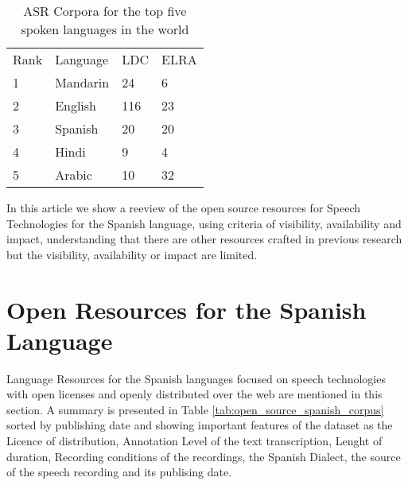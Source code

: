 \documentclass[10pt, a4paper]{article}
\begin{document}
\begin{table}[h]
\caption{ASR Corpora for the top five spoken languages in the world \cite{HernndezMena2017}}
\label{tab:resources_by_langauge}
\begin{tabular}{llll}
Rank & Language & LDC & ELRA \\
1    & Mandarin & 24  & 6    \\
2    & English  & 116 & 23   \\
3    & Spanish  & 20  & 20   \\
4    & Hindi    & 9   & 4    \\
5    & Arabic   & 10  & 32  
\end{tabular}
\end{table}


In this article we show a reeview of the open source resources for Speech Technologies for the Spanish language, using criteria of visibility, availability and impact, understanding that there are other resources crafted in previous research but the visibility, availability or impact are limited.

\section{Open Resources for the Spanish Language}

Language Resources for the Spanish languages focused on speech technologies with open licenses and openly distributed over the web are mentioned in this section. A summary is presented in Table \ref{tab:open_source_spanish_corpus} sorted by publishing date and showing important features of the dataset as the Licence of distribution, Annotation Level of the text transcription, Lenght of duration, Recording conditions of the recordings, the Spanish Dialect, the source of the speech recording and its publising date.
\end{document}
